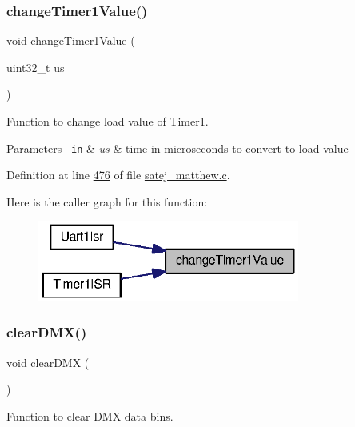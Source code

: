 \subsubsection{\texorpdfstring{changeTimer1Value()}{changeTimer1Value()}}
{\footnotesize\ttfamily void change\+Timer1\+Value (\begin{DoxyParamCaption}\item[{uint32\+\_\+t}]{us }\end{DoxyParamCaption})}



Function to change load value of Timer1. 


\begin{DoxyParams}[1]{Parameters}
\mbox{\texttt{ in}}  & {\em us} & time in microseconds to convert to load value \\
\hline
\end{DoxyParams}


Definition at line \mbox{\hyperlink{satej__matthew_8c_source_l00476}{476}} of file \mbox{\hyperlink{satej__matthew_8c_source}{satej\+\_\+matthew.\+c}}.

Here is the caller graph for this function\+:\nopagebreak
\begin{figure}[H]
\begin{center}
\leavevmode
\includegraphics[width=244pt]{satej__matthew_8c_ae0e2b59e29ecdbadeb6bfa1a9efa5a85_icgraph}
\end{center}
\end{figure}
\mbox{\label{satej__matthew_8c_a90f05ed3280bc7f2e971ed7216028960}} 
\subsubsection{\texorpdfstring{clearDMX()}{clearDMX()}}
{\footnotesize\ttfamily void clear\+D\+MX (\begin{DoxyParamCaption}{ }\end{DoxyParamCaption})}



Function to clear D\+MX data bins. 



